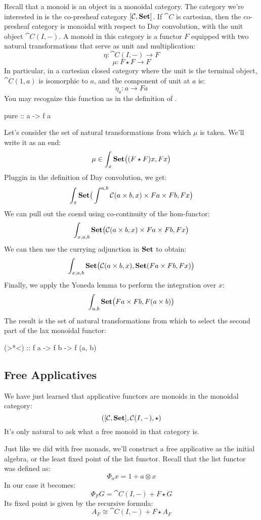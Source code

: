 \documentclass[DaoFP]{subfiles}
\begin{document}
Recall that a monoid is an object in a monoidal category. The category we're interested in is the co-presheaf category $[\mathcal{C}, \mathbf{Set}]$. If $\cat C$ is cartesian, then the co-presheaf category is monoidal with respect to Day convolution, with the unit object $\cat C(I, -)$. A monoid in this category is a functor $F$ equipped with two natural transformations that serve as unit and multiplication:
\[ \eta \colon \cat C(I, -) \to F \]
\[ \mu \colon F \star F \to F \]
In particular, in a cartesian closed category where the unit is the terminal object, $\cat C(1, a)$ is isomorphic to $a$, and the component of unit at $a$ is:
\[ \eta_a \colon a \to F a \] 
You may recognize this function as  in the definition of .
\begin{haskell}
pure :: a -> f a
\end{haskell}

Let's consider the set of natural transformations from which $\mu$ is taken. We'll write it as an end:
\[ \mu \in \int_x \mathbf{Set} \big( (F \star F) x, F x \big) \]
Pluggin in the definition of Day convolution, we get:
\[ \int_x \mathbf{Set} \big( \int^{a, b} \mathcal{C} (a \times b, x) \times F a \times  F b, F x \big) \]
We can pull out the coend using co-continuity of the hom-functor:
\[ \int_{x, a, b} \mathbf{Set} \big( \mathcal{C} (a \times b, x) \times F a \times  F b, F x \big) \]
We can then use the currying adjunction in $\mathbf{Set}$ to obtain:
\[ \int_{x, a, b} \mathbf{Set} \big( \mathcal{C} (a \times b, x),  \mathbf{Set}( F a \times  F b, F x) \big) \]
Finally, we apply the Yoneda lemma to perform the integration over $x$:
\[ \int_{a, b}  \mathbf{Set} \big( F a \times  F b, F (a \times b) \big) \]
The result is the set of natural transformations from which to select the second part of the lax monoidal functor:
\begin{haskell}
  (>*<) :: f a -> f b -> f (a, b)
\end{haskell}

\subsection{Free Applicatives}

We have just learned that applicative functors are monoids in the monoidal category:
\[ ([\mathcal{C}, \mathbf{Set}], \mathcal{C}(I, -), \star) \]
It's only natural to ask what a free monoid in that category is. 

Just like we did with free monads, we'll construct a free applicative as the initial algebra, or the least fixed point of the list functor. Recall that the list functor was defined as:
\[ \Phi_a x = 1 + a \otimes x \]
In our case it becomes:
\[ \Phi_F G = \cat C(I, -) + F \star G \]
Its fixed point is given by the recursive formula:
\[ A_F \cong \cat C(I, -) + F \star A_F\]
\end{document}
